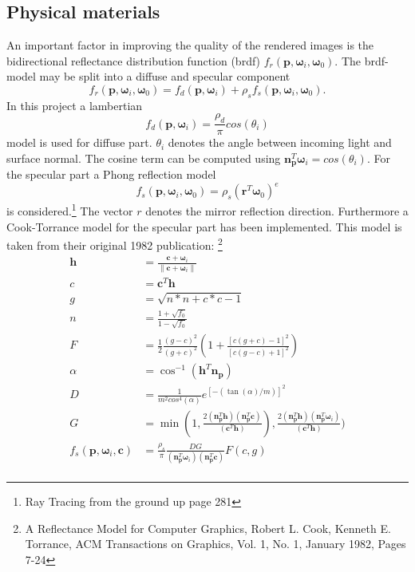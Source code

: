 \subsection{Physical materials}
An important factor in improving the quality of the rendered images is the bidirectional reflectance distribution function (brdf) $f_r(\mathbf{p},\mathbf{\omega}_i,\mathbf{\omega}_0)$. The brdf-model may be split into a diffuse and specular component
\begin{equation}
f_r(\mathbf{p},\mathbf{\omega}_i,\mathbf{\omega}_0) = f_d(\mathbf{p},\mathbf{\omega}_i) + \rho_s f_s(\mathbf{p},\mathbf{\omega}_i,\mathbf{\omega}_0).
\end{equation}
In this project a lambertian
\begin{equation}
f_d(\mathbf{p},\mathbf{\omega}_i) = \frac{\rho_d}{\pi} cos(\theta_i)
\end{equation}
model is used for diffuse part. $\theta_i$ denotes the angle between incoming light and surface normal. The cosine term can be computed using $\mathbf{n}_{\mathbf{p}}^T \mathbf{\omega}_i = cos(\theta_i)$.  
For the specular part a Phong reflection model 
\begin{equation}
f_s(\mathbf{p},\mathbf{\omega}_i,\mathbf{\omega}_0) = \rho_s (\mathbf{r}^T \mathbf{\omega}_0)^e
\end{equation}
is considered.\footnote{Ray Tracing from the ground up page 281} The vector $r$ denotes the mirror reflection direction.  Furthermore a Cook-Torrance model for the specular part has been implemented. This model is taken from their original 1982 publication: \footnote{A Reflectance Model for Computer Graphics, Robert L. Cook, Kenneth E. Torrance, ACM Transactions on Graphics, Vol. 1, No. 1, January 1982, Pages 7-24}
\begin{align}
\mathbf{h} &= \frac{\mathbf{c} + \mathbf{\omega}_i}{\| \mathbf{c} + \mathbf{\omega}_i \|} \\
c & = \mathbf{c}^T \mathbf{h} \\
g &=  \sqrt{n*n + c*c - 1} \\
n &= \frac{1 + \sqrt{f_0}}{1 - \sqrt{f_0}} \\
F &= \frac{1}{2} \frac{(g - c)^2}{(g + c)^2} (1 + \frac{[c (g + c) - 1]^2}{[c (g - c) + 1]^2}) \\
\alpha &= \cos^{-1}(\mathbf{h}^T \mathbf{n}_\mathbf{p}) \\
D &= \frac{1}{m^2 cos^4(\alpha)}e^{[-(\tan(\alpha)/m)]^2} \\
G &= \min(1,
     \frac{2 (\mathbf{n}_\mathbf{p}^T \mathbf{h})(\mathbf{n}_\mathbf{p}^T \mathbf{c})  }{(\mathbf{c}^T \mathbf{h})}),
     \frac{2 (\mathbf{n}_\mathbf{p}^T \mathbf{h})(\mathbf{n}_\mathbf{p}^T \mathbf{\omega}_i)  }{(\mathbf{c}^T \mathbf{h})}) \\
f_s(\mathbf{p},\mathbf{\omega}_i,\mathbf{c}) &= \frac{\rho_s}{\pi}
 \frac{DG}{(\mathbf{n}_{\mathbf{p}}^T \mathbf{\omega}_i)(\mathbf{n}_{\mathbf{p}}^T \mathbf{c})} F(c,g) \\
\end{align} 
